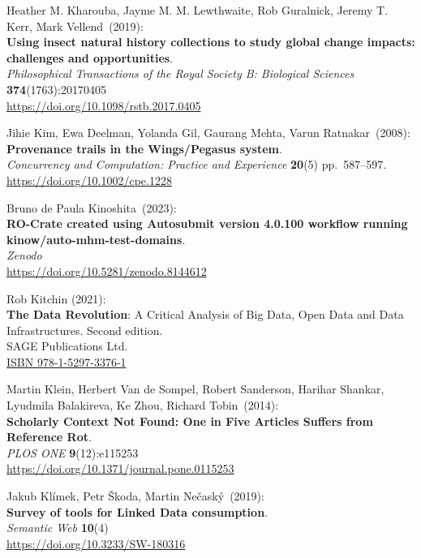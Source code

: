 \begin{thebibliography}{9}
Heather M. Kharouba, Jayme M. M. Lewthwaite, Rob Guralnick, Jeremy T. Kerr, Mark Vellend~(2019): \\
\textbf{Using insect natural history collections to study global change impacts: challenges and opportunities}.\\
\emph{Philosophical Transactions of the Royal Society B: Biological Sciences}
\textbf{374}(1763):20170405\\
\url{https://doi.org/10.1098/rstb.2017.0405}

Jihie Kim, Ewa Deelman, Yolanda Gil, Gaurang Mehta, Varun Ratnakar~(2008): \\
\textbf{Provenance trails in the Wings/Pegasus system}.\\
\emph{Concurrency and Computation: Practice and Experience}
\textbf{20}(5) pp.~587--597.\\
\url{https://doi.org/10.1002/cpe.1228}

Bruno de Paula Kinoshita~(2023): \\
\textbf{RO-Crate created using Autosubmit version 4.0.100 workflow running kinow/auto-mhm-test-domains}.\\
\emph{Zenodo}\\
\url{https://doi.org/10.5281/zenodo.8144612}

Rob Kitchin (2021):\\
\textbf{The Data Revolution}:  A Critical Analysis of Big Data, Open Data and Data Infrastructures. 
Second edition. \\ 
SAGE Publications Ltd. \\
\href{https://identifiers.org/isbn/9781529733761}{ISBN 978-1-5297-3376-1}

Martin Klein, Herbert Van de Sompel, Robert Sanderson, Harihar Shankar, Lyudmila Balakireva, Ke Zhou, Richard Tobin~(2014): \\
\textbf{Scholarly Context Not Found: One in Five Articles Suffers from Reference Rot}.\\
\emph{PLOS ONE} \textbf{9}(12):e115253\\
\url{https://doi.org/10.1371/journal.pone.0115253}

Jakub Klímek, Petr Škoda, Martin Nečaský~(2019): \\
\textbf{Survey of tools for Linked Data consumption}. \\
\emph{Semantic Web} \textbf{10}(4) \\
\url{https://doi.org/10.3233/SW-180316}


\end{thebibliography}

